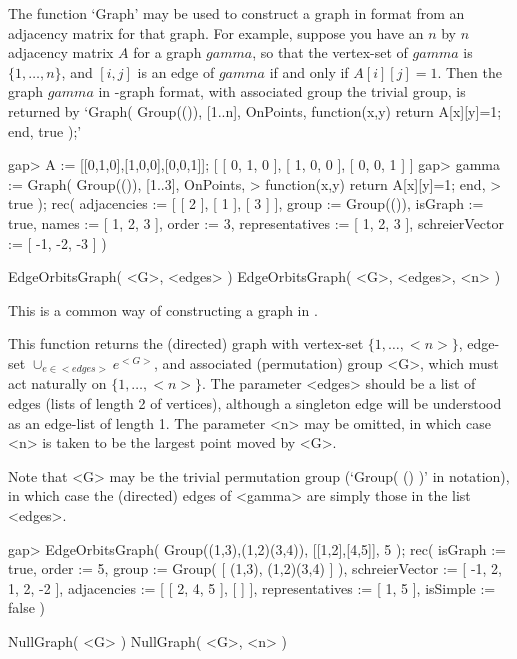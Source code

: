 The function `Graph' may be used to construct a graph in {\GRAPE} format
from an adjacency matrix
for that graph. For
example, suppose you have an $n$ by $n$ adjacency matrix $A$ for a graph
$gamma$, so that the vertex-set of $gamma$ is $\{1,\ldots,n\}$, and
$[i,j]$ is an edge of $gamma$ if and only if $A[i][j]=1$.  Then the graph
$gamma$ in {\GRAPE}-graph format, with associated group the trivial group,
is returned by `Graph( Group(()), [1..n], OnPoints, function(x,y) return
A[x][y]=1; end, true );'

\beginexample
gap> A := [[0,1,0],[1,0,0],[0,0,1]];
[ [ 0, 1, 0 ], [ 1, 0, 0 ], [ 0, 0, 1 ] ]
gap> gamma := Graph( Group(()), [1..3], OnPoints,
>        function(x,y) return A[x][y]=1; end,
>        true );
rec( adjacencies := [ [ 2 ], [ 1 ], [ 3 ] ], group := Group(()), 
  isGraph := true, names := [ 1, 2, 3 ], order := 3,
  representatives := [ 1, 2, 3 ], schreierVector := [ -1, -2, -3 ] )
\endexample


\>EdgeOrbitsGraph( <G>, <edges> )
\>EdgeOrbitsGraph( <G>, <edges>, <n> )

This is a common way of constructing a graph in {\GRAPE}.

This function returns the (directed) graph with vertex-set $\{1,\ldots,
<n>\}$, edge-set $\cup_{e\in <edges>} e^{<G>}$, and associated
(permutation) group <G>, which must act naturally on $\{1,\ldots,<n>\}$.
The parameter <edges> should be a list of edges (lists of length 2 of
vertices), although a singleton edge will be understood as an edge-list
of length 1. The parameter <n> may be omitted, in which case <n> is
taken to be the largest point moved by <G>.

Note that <G> may be the trivial permutation group (`Group( () )' in
{\GAP} notation), in which case the (directed) edges of <gamma> are
simply those in the list <edges>.

\beginexample
gap> EdgeOrbitsGraph( Group((1,3),(1,2)(3,4)), [[1,2],[4,5]], 5 );
rec(
  isGraph := true,
  order := 5,
  group := Group( [ (1,3), (1,2)(3,4) ] ),
  schreierVector := [ -1, 2, 1, 2, -2 ],
  adjacencies := [ [ 2, 4, 5 ], [  ] ],
  representatives := [ 1, 5 ],
  isSimple := false )
\endexample


\>NullGraph( <G> )
\>NullGraph( <G>, <n> )

